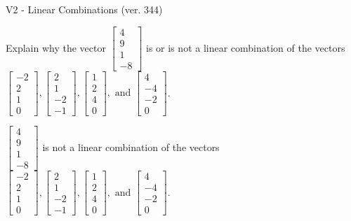 \begin{exercise}
  \begin{exerciseTitle}V2 - Linear Combinations (ver. 344)\end{exerciseTitle}
  \begin{exerciseStatement}
    Explain why the vector \(\left[\begin{array}{c}
4 \\
9 \\
1 \\
-8
\end{array}\right]\)  is or is not a linear 
	combination of the vectors \(\left[\begin{array}{c}
-2 \\
2 \\
1 \\
0
\end{array}\right] , \left[\begin{array}{c}
2 \\
1 \\
-2 \\
-1
\end{array}\right] , \left[\begin{array}{c}
1 \\
2 \\
4 \\
0
\end{array}\right] , \text{ and } \left[\begin{array}{c}
4 \\
-4 \\
-2 \\
0
\end{array}\right]\).
	


  \end{exerciseStatement}
  \begin{exerciseAnswer}
   \(\left[\begin{array}{c}
4 \\
9 \\
1 \\
-8
\end{array}\right]\) 
  	 is not  
	a linear combination of the vectors \(\left[\begin{array}{c}
-2 \\
2 \\
1 \\
0
\end{array}\right] , \left[\begin{array}{c}
2 \\
1 \\
-2 \\
-1
\end{array}\right] , \left[\begin{array}{c}
1 \\
2 \\
4 \\
0
\end{array}\right] , \text{ and } \left[\begin{array}{c}
4 \\
-4 \\
-2 \\
0
\end{array}\right]\).


\end{exerciseAnswer}
\end{exercise}
